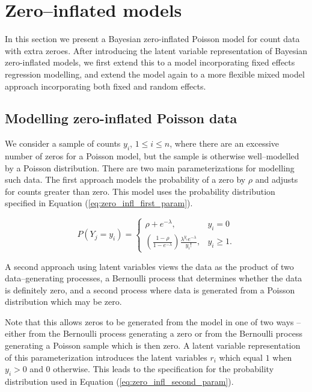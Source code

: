 \section{Zero--inflated models}
\label{sec:model}

In this section we present a Bayesian zero-inflated Poisson model for count data with extra zeroes. After
introducing the latent variable representation of Bayesian zero-inflated models, we first extend this to a
model incorporating fixed effects regression modelling, and extend the model again to a more flexible mixed
model approach incorporating both fixed and random effects.

\subsection{Modelling zero-inflated Poisson data}

We consider a sample of counts $y_i$, $1 \le i\le n$, where there are an excessive number of zeros for a
Poisson model, but the sample is otherwise well--modelled by a Poisson distribution. There are two main
parameterizations for modelling such data. The first approach models the probability of a zero by $\rho$ and
adjusts for counts greater than zero. This model uses the probability distribution specified in
Equation (\ref{eq:zero_infl_first_param}).

\begin{equation}
\label{eq:zero_infl_first_param}
	P(Y_j = y_i) = \left\{ \begin{array}{ll}
	\rho + e^{-\lambda},  & y_i = 0 \\
	\left( \frac{1 - \rho}{1 - e^{-\lambda}} \right) \frac{\lambda^{y_i} e^{-\lambda}} {y_i!},  &y_i \ge 1.
	\end{array} \right.
\end{equation}

A second approach using latent variables views the data as the product of two data--generating processes, a
Bernoulli process that determines whether the data is definitely zero, and a second process where data is
generated from a Poisson distribution which may be zero.

Note that this allows zeros to be generated from the model in one of two ways -- either from the Bernoulli
process generating a zero or from the Bernoulli process generating a Poisson sample which is then zero. A
latent variable representation of this parameterization introduces the latent variables $r_i$ which equal $1$
when $y_i>0$ and $0$ otherwise. This leads to the specification for the probability distribution used in
Equation (\ref{eq:zero_infl_second_param}).


